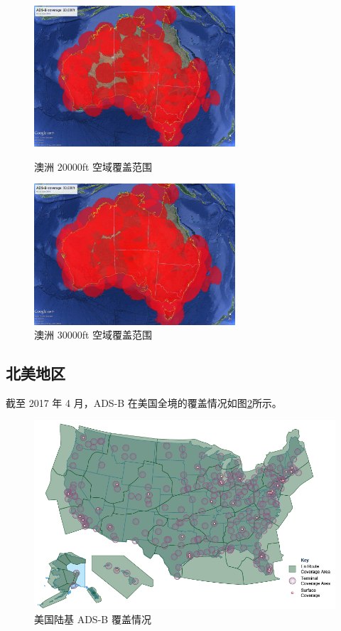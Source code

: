 \begin{figure}[htbp]
\centering
\begin{minipage}[t]{0.48\textwidth}
\centering
\includegraphics[width=7.5cm]{pic/ADS-B-20k.jpg}
\caption{澳洲 20000ft 空域覆盖范围}
\label{fig:ADS-B-20k}
\end{minipage}
\begin{minipage}[t]{0.48\textwidth}
\centering
\includegraphics[width=7.5cm]{pic/ADS-B-30k.jpg}
\caption{澳洲 30000ft 空域覆盖范围}
\label{fig:ADS-B-30k}
\end{minipage}
\end{figure}


\subsection{北美地区}

截至 2017 年 4 月，ADS-B 在美国全境的覆盖情况如图\ref{fig:ADS-B-Coverage-Area}所示。

\begin{figure}[htbp]
\centering
\includegraphics[width=14cm]{pic/ADS-B-Coverage-Area.png}
\caption{美国陆基 ADS-B 覆盖情况\protect\footnotemark}
\label{fig:ADS-B-Coverage-Area}
\end{figure}


